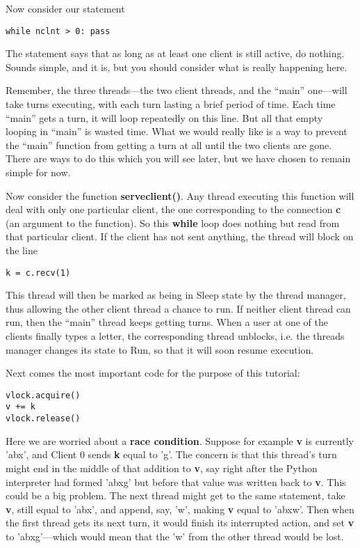 Now consider our statement

\begin{Verbatim}[fontsize=\relsize{-2}]
while nclnt > 0: pass
\end{Verbatim}

The statement says that as long as at least one client is still active,
do nothing.  Sounds simple, and it is, but you should consider what is
really happening here.

Remember, the three threads---the two client threads, and the ``main''
one---will take turns executing, with each turn lasting a brief period
of time.  Each time ``main'' gets a turn, it will loop repeatedly on
this line.  But all that empty looping in ``main'' is wasted time.  What
we would really like is a way to prevent the ``main'' function from
getting a turn at all until the two clients are gone.  There are ways to
do this which you will see later, but we have chosen to remain simple
for now.

Now consider the function {\bf serveclient()}.  Any thread executing
this function will deal with only one particular client, the one
corresponding to the connection {\bf c} (an argument to the function).
So this {\bf while} loop does nothing but read from that particular
client.  If the client has not sent anything, the thread will block on 
the line

\begin{Verbatim}[fontsize=\relsize{-2}]
k = c.recv(1)
\end{Verbatim}

This thread will then be marked as being in Sleep state by the thread
manager, thus allowing the other client thread a chance to run.  If
neither client thread can run, then the ``main'' thread keeps getting
turns.  When a user at one of the clients finally types a letter, the
corresponding thread unblocks, i.e. the threads manager changes its
state to Run, so that it will soon resume execution.

Next comes the most important code for the purpose of this tutorial:

\begin{Verbatim}[fontsize=\relsize{-2}]
vlock.acquire()
v += k
vlock.release()
\end{Verbatim}

Here we are worried about a {\bf race condition}.  Suppose for example
{\bf v} is currently 'abx', and Client 0 sends {\bf k} equal to 'g'.
The concern is that this thread's turn might end in the middle of that
addition to {\bf v}, say right after the Python interpreter had formed
'abxg' but before that value was written back to {\bf v}.  This could be
a big problem.  The next thread might get to the same statement, take
{\bf v}, still equal to 'abx', and append, say, 'w', making {\bf v}
equal to 'abxw'.  Then when the first thread gets its next turn, it
would finish its interrupted action, and set {\bf v} to 'abxg'---which
would mean that the 'w' from the other thread would be lost.  

